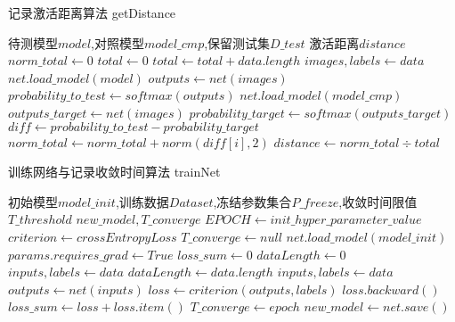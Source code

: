 \begin{algorithm}
	\renewcommand{\algorithmicrequire}{\textbf{Input:}}
	\renewcommand{\algorithmicensure}{\textbf{Output:}}
	\caption{记录激活距离算法  getDistance}
	\label{algorithm:getDistance}
	\begin{algorithmic}[1]
        \REQUIRE 待测模型$model$,对照模型$model\_cmp$,保留测试集$D\_test$
        \ENSURE  激活距离$distance$
        \STATE $norm\_total \gets 0$
        \STATE $total \gets 0$
            \STATE $total \gets total + data.length$
            \STATE $images, labels \gets data$
            \STATE $net.load\_model(model)$
            \STATE $outputs \gets net(images)$
            \STATE $probability\_to\_test \gets softmax(outputs)$
            \STATE $net.load\_model(model\_cmp)$
            \STATE $outputs\_target \gets net(images)$
            \STATE $probability\_target \gets softmax(outputs\_target)$
            \STATE $diff \gets probability\_to\_test - probability\_target $
                \STATE $norm\_total \gets norm\_total + norm(diff[i],2)$
            \ENDFOR
        \ENDFOR
        \STATE $distance \gets norm\_total \div total$
	\end{algorithmic}  
\end{algorithm}

\begin{algorithm}
	\renewcommand{\algorithmicrequire}{\textbf{Input:}}
	\renewcommand{\algorithmicensure}{\textbf{Output:}}
	\caption{训练网络与记录收敛时间算法  trainNet}
	\label{algorithm:trainNet}
	\begin{algorithmic}[1]
        \REQUIRE 初始模型$model\_init$,训练数据$Dataset$,冻结参数集合$P\_freeze$,收敛时间限值$T\_threshold$
        \ENSURE  $new\_model,T\_converge $
        \STATE $EPOCH \gets init\_hyper\_parameter\_value$
        \STATE $criterion \gets crossEntropyLoss$
        \STATE $T\_converge \gets null$
        \STATE $net.load\_model(model\_init)$
                \STATE $params.requires\_grad \gets True$
            \ENDIF
        \ENDFOR
            \STATE $loss\_sum \gets 0$
            \STATE $dataLength \gets 0$
            \STATE $inputs, labels \gets data$
            \STATE $dataLength \gets data.length$
                \STATE $inputs,labels \gets data$
                \STATE $outputs \gets net(inputs)$
                \STATE $loss \gets criterion(outputs, labels)$
                \STATE $loss.backward()$
                \STATE $loss\_sum \gets loss + loss.item()$
            \ENDFOR
                \STATE $T\_converge \gets epoch$
            \ENDIF
        \ENDFOR
        \STATE $new\_model \gets net.save()$
	\end{algorithmic}  
\end{algorithm}

